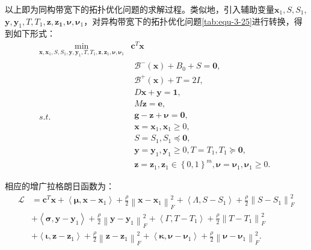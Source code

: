 以上即为同构带宽下的拓扑优化问题的求解过程。类似地，引入辅助变量$\mathbf{x}_1,S,S_1,$ $\mathbf{y},\mathbf{y}_1,T,T_1,\mathbf{z},\mathbf{z_1},\mathbf{\nu },\mathbf{\nu }_1$，对异构带宽下的拓扑优化问题\autoref{tab:equ-3-25}进行转换，得到如下形式：
\begin{equation}
    \label{tab:equ-3-45}
    \begin{matrix}
        \underset{\mathbf{x},\mathbf{x}_1,S,S_1,\mathbf{y},\mathbf{y}_1,T,T_1,\mathbf{z},\mathbf{z}_1,\mathbf{\nu },\mathbf{\nu }_1}{\min}&		\boldsymbol{c}^T\mathbf{x}\\
        s.t.&		\begin{array}{c}
        \mathcal{B} ^-\left( \mathbf{x} \right) +B_0+S=\mathbf{0},\\
        \mathcal{B} ^+\left( \mathbf{x} \right) +T=2I,\\
        D\mathbf{x}+\mathbf{y}=\mathbf{1},\\
        M\mathbf{z}=\boldsymbol{e},\\
        \mathbf{g}-\mathbf{z}+\mathbf{\nu }=\mathbf{0},\\
        \mathbf{x}=\mathbf{x}_1,\mathbf{x}_1\ge 0,\\
        S=S_1,S_1\preceq \mathbf{0},\\
        \mathbf{y}=\mathbf{y}_1,\mathbf{y}_1\ge 0,T=T_1,T_1\succcurlyeq \mathbf{0},\\
        \mathbf{z}=\mathbf{z}_1,\mathbf{z}_1\in \left\{ 0,1 \right\} ^m,\mathbf{\nu }=\mathbf{\nu }_1,\mathbf{\nu }_1\ge 0.\\
    \end{array}\\
    \end{matrix}
\end{equation}
相应的增广拉格朗日函数为：
\begin{equation}
    \begin{aligned}
    \label{tab:equ-3-46}
    \mathcal{L} &=\boldsymbol{c}^T\mathbf{x}+\left< \boldsymbol{\mu },\mathbf{x}-\mathbf{x}_1 \right> +\frac{\rho}{2}\left\| \mathbf{x}-\mathbf{x}_1 \right\| _{F}^{2}+\left< \varLambda ,S-S_1 \right> +\frac{\rho}{2}\left\| S-S_1 \right\| _{F}^{2}
\\
&+\left< \boldsymbol{\sigma },\mathbf{y}-\mathbf{y}_1 \right> +\frac{\rho}{2}\left\| \mathbf{y}-\mathbf{y}_1 \right\| _{F}^{2}+\left< \varGamma ,T-T_1 \right> +\frac{\rho}{2}\left\| T-T_1 \right\| _{F}^{2}
\\
&+\left< \boldsymbol{\iota },\mathbf{z}-\mathbf{z}_1 \right> +\frac{\rho}{2}\left\| \mathbf{z}-\mathbf{z}_1 \right\| _{F}^{2}+\left< \boldsymbol{\kappa },\mathbf{\nu }-\mathbf{\nu }_1 \right> +\frac{\rho}{2}\left\| \mathbf{\nu }-\mathbf{\nu }_1 \right\| _{F}^{2}.
    \end{aligned}
\end{equation}


